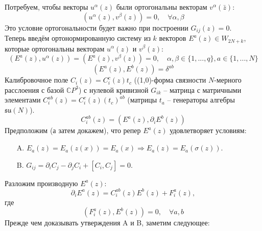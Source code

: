 \documentclass[12pt]{article}
\theoremstyle{definition}
\begin{document}
Потребуем, чтобы векторы $u^\alpha(z)$ были ортогональны векторам $v^\alpha(\bar{z})$:
\begin{equation}
    (u^\alpha(z),v^\beta(z))=0,\quad\forall\alpha,\beta
\end{equation}
Это условие ортогональности будет важно при построении $G_{ij}(z) = 0$.\\
Теперь введём ортонормированную систему из $k$ векторов $E^a(z)\in W_{2N+k}$, которые ортогональны векторам $u^\alpha(z)$ и $v^\beta(z)$:
\begin{equation}
    (E^a(z),u^\alpha(z))=(E^a(z),v^\beta(z))=0,\quad\alpha,\beta\in\{1,...,q\},a\in\{1,...,N\}
\end{equation}
\begin{equation}
    (E^a(z),E^b(z))=\delta^{ab}
\end{equation}
Калибровочное поле $C_i(z) = C^c_i(z)t_c$ ((1,0)-форма связности $N$-мерного расслоения с базой $\mathbb{C}P^3$) с нулевой кривизной $G_{ik}$ -- матрица с матричными элементами $C^{ab}_i(z) = C^c_i(z)(t_c)^{ab}$ (матрицы $t_a$ -- генераторы алгебры $\mathfrak{su}(N)$).
\begin{equation}
    C_i^{ab}(z)=(E^a(z),\partial_iE^b(z))
\end{equation}
Предположим (а затем докажем), что репер $E^a(z)$ удовлетворяет условиям:
\begin{itemize}
    \item[A.] $E_a(z)=E_a(z(x))=E_a(x)\Rightarrow E_a(z)=E_a(\sigma(z))$.
    \item[B.] $G_{ij}=\partial_iC_j-\partial_jC_i+[C_i,C_j]=0$.
\end{itemize}
Разложим производную $E^a(z)$:
\begin{equation}
    \partial_iE^a(z)=C_i^{ab}(z)E^b(z)+F_i^a(z),
\end{equation}
где
\begin{equation}
    (F_i^a(z),E^b(z))=0,\quad\forall a,b
\end{equation}
Прежде чем доказывать утверждения A и B, заметим следующее:
\end{document}
